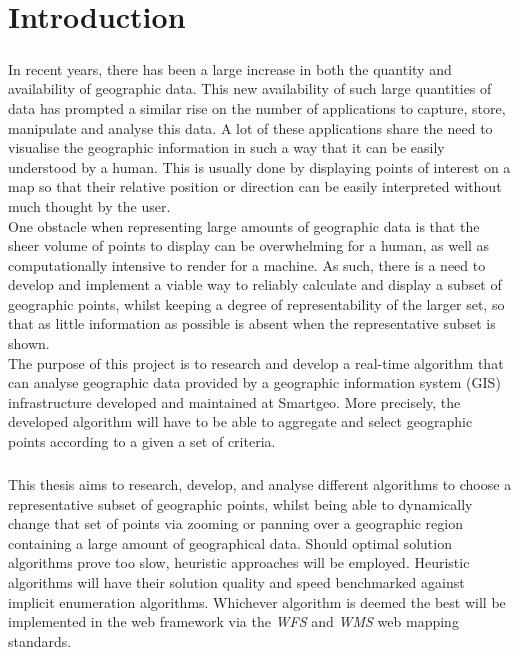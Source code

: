 \chapter{Introduction}
\label{chap:intro}
\paragraph{}
In recent years, there has been a large increase in both the quantity and availability of geographic data. This new availability of such large quantities of data has prompted a similar rise on the number of applications to capture, store, manipulate and analyse this data.
A lot of these applications share the need to visualise the geographic information in such a way that it can be easily understood by a human.
This is usually done by displaying points of interest on a map so that their relative position or direction can be easily interpreted without much thought by the user.
\\
One obstacle when representing large amounts of geographic data is that the sheer volume of points to display can be overwhelming for a human, as well as computationally intensive to render for a machine. As such, there is a need to develop and implement a viable way to reliably calculate and display a subset of geographic points, whilst keeping a degree of representability of the larger set, so that as little information as possible is absent when the representative subset is shown.
\\
The purpose of this project is to research and develop a real-time algorithm that can analyse geographic data provided by a geographic information system (GIS) infrastructure developed and maintained at Smartgeo. More precisely, the developed algorithm will have to be able to aggregate and select geographic points according to a given a set of criteria.
\\

\paragraph{}
This thesis aims to research, develop, and analyse different algorithms to choose a representative subset of geographic points, whilst being able to dynamically change that set of points via zooming or panning over a geographic region containing a large amount of geographical data. Should optimal solution algorithms prove too slow, heuristic approaches will be employed. Heuristic algorithms will have their solution quality and speed benchmarked against implicit enumeration algorithms.
Whichever algorithm is deemed the best will be implemented in the web framework via the \emph{WFS} and \emph{WMS} web mapping standards.
